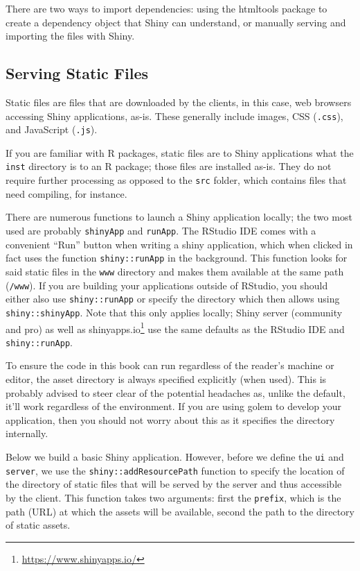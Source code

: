 \documentclass[10pt,]{krantz}
\renewcommand{\href}[2]{#2\footnote{\url{#1}}}
\begin{document}
There are two ways to import dependencies: using the htmltools \citep{R-htmltools} package to create a dependency object that Shiny can understand, or manually serving and importing the files with Shiny.

\hypertarget{basics-static-files}{%
\subsection{Serving Static Files}\label{basics-static-files}}

Static files are files that are downloaded by the clients, in this case, web browsers accessing Shiny applications, as-is. These generally include images, CSS (\texttt{.css}), and JavaScript (\texttt{.js}).

If you are familiar with R packages, static files are to Shiny applications what the \texttt{inst} directory is to an R package; those files are installed as-is. They do not require further processing as opposed to the \texttt{src} folder, which contains files that need compiling, for instance.

There are numerous functions to launch a Shiny application locally; the two most used are probably \texttt{shinyApp} and \texttt{runApp}. The RStudio IDE comes with a convenient ``Run'' button when writing a shiny application, which when clicked in fact uses the function \texttt{shiny::runApp} in the background. This function looks for said static files in the \texttt{www} directory and makes them available at the same path (\texttt{/www}). If you are building your applications outside of RStudio, you should either also use \texttt{shiny::runApp} or specify the directory which then allows using \texttt{shiny::shinyApp}. Note that this only applies locally; Shiny server (community and pro) as well as \href{https://www.shinyapps.io/}{shinyapps.io} use the same defaults as the RStudio IDE and \texttt{shiny::runApp}.

To ensure the code in this book can run regardless of the reader's machine or editor, the asset directory is always specified explicitly (when used). This is probably advised to steer clear of the potential headaches as, unlike the default, it'll work regardless of the environment. If you are using golem \citep{R-golem} to develop your application, then you should not worry about this as it specifies the directory internally.

Below we build a basic Shiny application. However, before we define the \texttt{ui} and \texttt{server}, we use the \texttt{shiny::addResourcePath} function to specify the location of the directory of static files that will be served by the server and thus accessible by the client. This function takes two arguments: first the \texttt{prefix}, which is the path (URL) at which the assets will be available, second the path to the directory of static assets.
\end{document}
